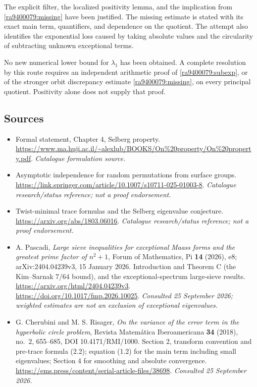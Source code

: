 \documentclass[11pt]{article}
\begin{document}
The explicit filter, the localized positivity lemma, and the implication
from \eqref{ra9400079:missing} have been justified. The missing estimate is stated
with its exact main term, quantifiers, and dependence on the quotient. The
attempt also identifies the exponential loss caused by taking absolute values
and the circularity of subtracting unknown exceptional terms.

No new numerical lower bound for $\lambda_1$ has been obtained. A complete
resolution by this route requires an independent arithmetic proof of
\eqref{ra9400079:subexp}, or of the stronger orbit discrepancy estimate
\eqref{ra9400079:missing}, on every principal quotient. Positivity alone does not
supply that proof.

\subsection{Sources}
\begin{itemize}\raggedright
\item[\textnormal{[S1]}]\hypertarget{source:9400079:1}{} Formal statement, Chapter 4, Selberg property.
\url{https://www.ma.huji.ac.il/~alexlub/BOOKS/On%20property/On%20property.pdf}.
{\small\textit{Catalogue formulation source.}}
\item[\textnormal{[S2]}]\hypertarget{source:9400079:2}{} Asymptotic independence for random permutations from surface groups.
\url{https://link.springer.com/article/10.1007/s10711-025-01003-8}.
{\small\textit{Catalogue research/status reference; not a proof endorsement.}}
\item[\textnormal{[S3]}]\hypertarget{source:9400079:3}{} Twist-minimal trace formulas and the Selberg eigenvalue conjecture.
\url{https://arxiv.org/abs/1803.06016}.
{\small\textit{Catalogue research/status reference; not a proof endorsement.}}
\item[\textnormal{[E1]}]\hypertarget{extra:9400079:1}{}
A. Pascadi, \emph{Large sieve inequalities for exceptional Maass forms and
the greatest prime factor of $n^2+1$}, Forum of Mathematics, Pi \textbf{14}
(2026), e8; arXiv:2404.04239v3, 15 January 2026. Introduction and Theorem C
(the Kim--Sarnak $7/64$ bound), and the exceptional-spectrum large-sieve
results. \url{https://arxiv.org/html/2404.04239v3}.
\url{https://doi.org/10.1017/fmp.2026.10025}.
{\small\textit{Consulted 25 September 2026; weighted estimates are not an
exclusion of exceptional eigenvalues.}}
\item[\textnormal{[E2]}]\hypertarget{extra:9400079:2}{}
G. Cherubini and M. S. Risager, \emph{On the variance of the error term in
the hyperbolic circle problem}, Revista Matem\'atica Iberoamericana
\textbf{34} (2018), no.~2, 655--685, DOI 10.4171/RMI/1000.
Section 2, transform convention and pre-trace formula (2.2); equation (1.2)
for the main term including small eigenvalues; Section 4 for smoothing and
absolute convergence.
\url{https://ems.press/content/serial-article-files/38698}.
{\small\textit{Consulted 25 September 2026.}}
\end{itemize}
\end{document}
